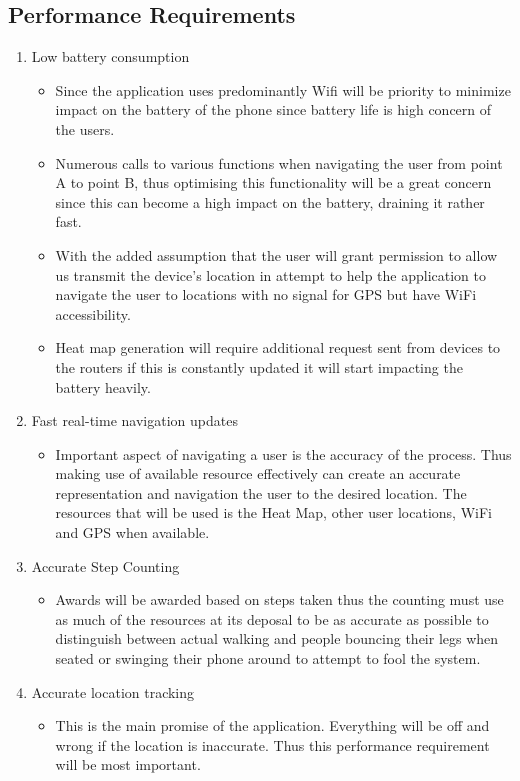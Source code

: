 \documentclass[11pt]{article}
\begin{document}
		\subsection{Performance Requirements}
			\begin{enumerate}
				\item Low battery consumption
					\begin{itemize}
						\item Since the application uses predominantly Wifi will be priority to minimize impact on the battery of the phone since battery life is high concern of the users.   
						\item Numerous calls to various functions when navigating the user from point A to point B, thus optimising this functionality will be a great concern since this can become a high impact on the battery, draining it rather fast.
						\item With the added assumption that the user will grant permission to allow us transmit the device's location in attempt to help the application to navigate the user to locations with no signal for GPS but have WiFi accessibility.
						\item Heat map generation will require additional request sent from devices to the routers if this is constantly updated it will start impacting the battery heavily.
					\end{itemize}
				\item Fast real-time navigation updates
					\begin{itemize}
						\item Important aspect of navigating a user is the accuracy of the process. Thus making use of available resource effectively can create an accurate representation and navigation the user to the desired location. The resources that will be used is the Heat Map, other user locations, WiFi and GPS when available.
					\end{itemize}
				\item Accurate Step Counting
					\begin{itemize}
						\item Awards will be awarded based on steps taken thus the counting must use as much of the resources at its deposal to be as accurate as possible to distinguish between actual walking and people bouncing their legs when seated or swinging their phone around to attempt to fool the system.
					\end{itemize}
				\item Accurate location tracking
					\begin{itemize}
						\item This is the main promise of the application. Everything will be off and wrong if the location is inaccurate. Thus this performance requirement will be most important.
					\end{itemize}  
			\end{enumerate}
      
\end{document}
